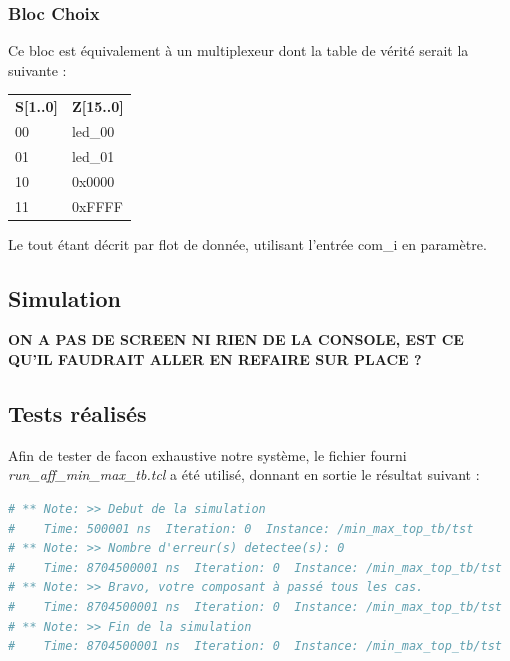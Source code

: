 \subsubsection{Bloc Choix}
Ce bloc est équivalement à un multiplexeur dont la table de vérité serait la suivante : 
\begin{center}

\begin{tabular}{l|l}
\textbf{S[1..0]} & \textbf{Z[15..0]} \\
00 & led\_00 \\
01 & led\_01 \\
10 & 0x0000 \\
11 & 0xFFFF 
\end{tabular}
\end{center}
Le tout étant décrit par flot de donnée, utilisant l'entrée com\_i en paramètre.
\subsection{Simulation}
\textbf{ON A PAS DE SCREEN NI RIEN DE LA CONSOLE, EST CE QU'IL FAUDRAIT ALLER EN REFAIRE SUR PLACE ?}
\subsection{Tests réalisés}
Afin de tester de facon exhaustive notre système, le fichier fourni \textit{run\_aff\_min\_max\_tb.tcl} a été utilisé, donnant en sortie le résultat suivant : 
\begin{lstlisting}[language=bash]
# ** Note: >> Debut de la simulation
#    Time: 500001 ns  Iteration: 0  Instance: /min_max_top_tb/tst
# ** Note: >> Nombre d'erreur(s) detectee(s): 0
#    Time: 8704500001 ns  Iteration: 0  Instance: /min_max_top_tb/tst
# ** Note: >> Bravo, votre composant à passé tous les cas.
#    Time: 8704500001 ns  Iteration: 0  Instance: /min_max_top_tb/tst
# ** Note: >> Fin de la simulation
#    Time: 8704500001 ns  Iteration: 0  Instance: /min_max_top_tb/tst

\end{lstlisting}
\newpage
